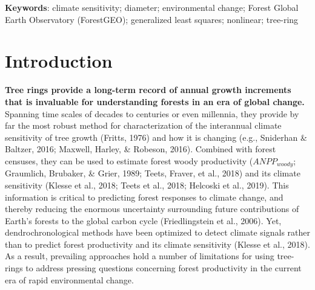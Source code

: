 \documentclass[
]{article}
\begin{document}
\textbf{Keywords}: climate sensitivity; diameter; environmental change;
Forest Global Earth Observatory (ForestGEO); generalized least squares;
nonlinear; tree-ring

\newpage

\hypertarget{introduction}{%
\section{Introduction}\label{introduction}}

\textbf{Tree rings provide a long-term record of annual growth
increments that is invaluable for understanding forests in an era of
global change.} Spanning time scales of decades to centuries or even
millennia, they provide by far the most robust method for
characterization of the interannual climate sensitivity of tree growth
(Fritts, 1976) and how it is changing (e.g., Sniderhan \& Baltzer, 2016;
Maxwell, Harley, \& Robeson, 2016). Combined with forest censuses, they
can be used to estimate forest woody productivity (\(ANPP_{woody}\);
Graumlich, Brubaker, \& Grier, 1989; Teets, Fraver, et al., 2018) and
its climate sensitivity (Klesse et al., 2018; Teets et al., 2018;
Helcoski et al., 2019). This information is critical to predicting
forest responses to climate change, and thereby reducing the enormous
uncertainty surrounding future contributions of Earth's forests to the
global carbon cycle (Friedlingstein et al., 2006). Yet,
dendrochronological methods have been optimized to detect climate
signals rather than to predict forest productivity and its climate
sensitivity (Klesse et al., 2018). As a result, prevailing approaches
hold a number of limitations for using tree-rings to address pressing
questions concerning forest productivity in the current era of rapid
environmental change.
\end{document}
